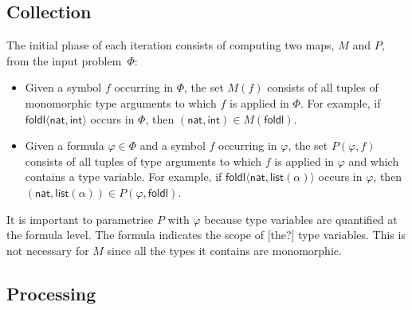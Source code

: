 \documentclass[]{ceurart}
\newcommand\ty[1]{\textsf{#1}}
\newcommand\sym[1]{\textsf{#1}}
\begin{document}
\subsection{Collection}
\label{ssec:collection}

The initial phase of each iteration consists of computing two maps, \(M\) and \(P\), from the input problem~$\Phi$:

\begin{itemize}
\item Given a symbol \(f\) occurring in \(\Phi\), the set \(M(f)\) consists of all tuples of monomorphic type arguments to which \(f\) is applied in \(\Phi\). For example, if \(\sym{foldl}\langle \ty{nat}, \ty{int}\rangle\) occurs in \(\Phi\), then \((\ty{nat}, \ty{int}) \in M(\sym{foldl}) \).

\item Given a formula \(\varphi \in \Phi\) and a symbol \(f\) occurring in \(\varphi\), the set \(P(\varphi, f)\) consists of all tuples of type arguments to which \(f\) is applied in \(\varphi\) and which contains a type variable. For example, if \(\sym{foldl}\langle \ty{nat}, \ty{list}(\alpha)\rangle\) occurs in \(\varphi\), then \((\ty{nat}, \ty{list}(\alpha)) \in P(\varphi, \sym{foldl}) \).
\end{itemize}

It is important to parametrise \(P\) with \(\varphi\) because type variables are quantified at the formula level. The formula indicates the scope of [the?] type variables. This is not necessary for \(M\) since all the types it contains are monomorphic.


\subsection{Processing}
\label{ssec:processing}
\end{document}
